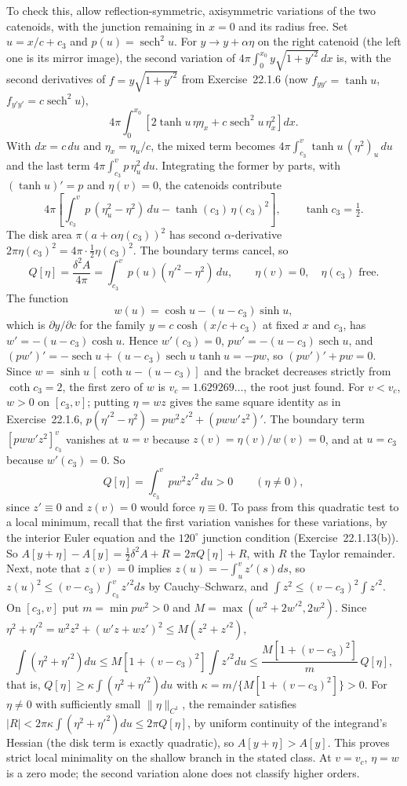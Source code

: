 To check this, allow reflection-symmetric, axisymmetric variations
of the two catenoids, with the junction remaining in $x=0$ and its
radius free. Set $u=x/c+c_3$ and $p(u)=\operatorname{sech}^2u$.
For $y\to y+\alpha\eta$ on the right catenoid (the left one is its
mirror image), the second variation of $4\pi\int_0^{x_0}y\sqrt{1+y'^2}\,dx$
is, with the second derivatives of $f=y\sqrt{1+y'^2}$ from
Exercise~22.1.6 (now $f_{yy'}=\tanh u$, $f_{y'y'}=c\operatorname{sech}^2u$),
\[
4\pi\int_0^{x_0}\left[2\tanh u\,\eta\eta_x
+c\operatorname{sech}^2u\,\eta_x^2\right]dx.
\]
With $dx=c\,du$ and $\eta_x=\eta_u/c$, the mixed term becomes
$4\pi\int_{c_3}^v\tanh u\,(\eta^2)_u\,du$ and the last term
$4\pi\int_{c_3}^vp\,\eta_u^2\,du$. Integrating the former by parts,
with $(\tanh u)'=p$ and $\eta(v)=0$, the catenoids contribute
\[
4\pi\left[\int_{c_3}^vp\,(\eta_u^2-\eta^2)\,du
-\tanh(c_3)\,\eta(c_3)^2\right],\qquad \tanh c_3=\tfrac12.
\]
The disk area $\pi(a+\alpha\eta(c_3))^2$ has second $\alpha$-derivative
$2\pi\eta(c_3)^2=4\pi\cdot\tfrac12\eta(c_3)^2$. The boundary terms
cancel, so
\[
 Q[\eta]=\frac{\delta^2A}{4\pi}
 =\int_{c_3}^{v}p(u)(\eta'^2-\eta^2)\,du,
 \qquad \eta(v)=0,\quad \eta(c_3)\text{ free}.
\]
The function
\[
 w(u)=\cosh u-(u-c_3)\sinh u,
\]
which is $\partial y/\partial c$ for the family $y=c\cosh(x/c+c_3)$ at
fixed $x$ and $c_3$, has $w'=-(u-c_3)\cosh u$. Hence $w'(c_3)=0$,
$pw'=-(u-c_3)\operatorname{sech}u$, and
$(pw')'=-\operatorname{sech}u+(u-c_3)\operatorname{sech}u\tanh u=-pw$,
so $(pw')'+pw=0$. Since $w=\sinh u\,[\coth u-(u-c_3)]$ and the bracket
decreases strictly from $\coth c_3=2$, the first zero of $w$ is
$v_c=1.629269\ldots$, the root just found. For $v<v_c$, $w>0$ on
$[c_3,v]$; putting $\eta=wz$ gives the same square identity as in
Exercise~22.1.6,
$p(\eta'^2-\eta^2)=pw^2z'^2+(pww'z^2)'$. The boundary term
$[pww'z^2]_{c_3}^v$ vanishes at $u=v$ because $z(v)=\eta(v)/w(v)=0$,
and at $u=c_3$ because $w'(c_3)=0$. So
\[
Q[\eta]=\int_{c_3}^{v}pw^2z'^2\,du>0\qquad(\eta\ne0),
\]
since $z'\equiv0$ and $z(v)=0$ would force $\eta\equiv0$.
To pass from this quadratic test to a local minimum, recall that the
first variation vanishes for these variations, by the interior Euler
equation and the $120^\circ$ junction condition (Exercise~22.1.13(b)).
So $A[y+\eta]-A[y]=\tfrac12\delta^2A+R=2\pi Q[\eta]+R$, with $R$ the
Taylor remainder. Next, note that $z(v)=0$ implies
$z(u)=-\int_u^v z'(s)ds$, so
$z(u)^2\le(v-c_3)\int_{c_3}^vz'^2ds$ by Cauchy--Schwarz, and
$\int z^2\le(v-c_3)^2\int z'^2$.
On $[c_3,v]$ put $m=\min pw^2>0$ and $M=\max(w^2+2w'^2,2w^2)$. Since
$\eta^2+\eta'^2=w^2z^2+(w'z+wz')^2\le M(z^2+z'^2)$,
\[
\int(\eta^2+\eta'^2)du\le M[1+(v-c_3)^2]\int z'^2du
\le\frac{M[1+(v-c_3)^2]}{m}\,Q[\eta],
\]
that is, $Q[\eta]\ge\kappa\int(\eta^2+\eta'^2)du$
with $\kappa=m/\{M[1+(v-c_3)^2]\}>0$. For $\eta\ne0$ with sufficiently
small $\|\eta\|_{C^1}$, the remainder satisfies
$|R|<2\pi\kappa\int(\eta^2+\eta'^2)du\le2\pi Q[\eta]$, by uniform
continuity of the integrand's Hessian (the disk term is exactly
quadratic), so $A[y+\eta]>A[y]$. This proves strict local minimality on
the shallow branch in the stated class. At $v=v_c$, $\eta=w$ is a
zero mode; the second variation alone does not classify higher orders.

